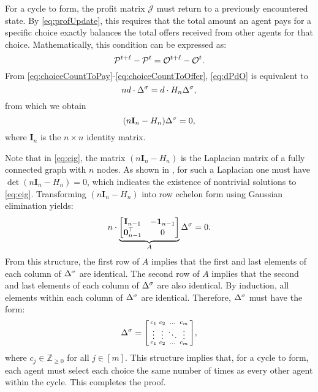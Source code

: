 \begin{customproof}
For a cycle to form, the profit matrix $\mathcal{J}$ must return to a previously encountered state. By \eqref{eq:profUpdate}, this requires that the total amount an agent pays for a specific choice exactly balances the total offers received from other agents for that choice. Mathematically, this condition can be expressed as:
\begin{equation}\label{eq:dPdO}
\mathcal{P}^{t+\ell} - \mathcal{P}^t = \mathcal{O}^{t+\ell} - \mathcal{O}^t.
\end{equation}
From \eqref{eq:choiceCountToPay}-\eqref{eq:choiceCountToOffer}, \eqref{eq:dPdO} is equivalent to
\begin{equation}
nd \cdot \Delta^\sigma = d \cdot H_n \Delta^\sigma,
\end{equation}
from which we obtain
\begin{equation}\label{eq:eig}
(n \textbf{I}_n - H_n) \Delta^\sigma = 0,
\end{equation}
where $\textbf{I}_n$ is the $n \times n$ identity matrix.

Note that in \eqref{eq:eig}, the matrix $(n \textbf{I}_n - H_n)$ is the Laplacian matrix of a fully connected graph with $n$ nodes. As shown in \cite[p.8]{lewis2013cooperative}, for such a Laplacian one must have $\det(n \textbf{I}_n - H_n) = 0$, which indicates the existence of nontrivial solutions to \eqref{eq:eig}. Transforming $(n \textbf{I}_n - H_n)$ into row echelon form using Gaussian elimination yields:
\begin{equation}
n \cdot
\underbrace{
\begin{bmatrix}
    \textbf{I}_{n-1} & -\textbf{1}_{n-1} \\
    \textbf{0}_{n-1}^\top & 0
\end{bmatrix}}_{A} \Delta^\sigma = 0.
\end{equation}
From this structure, the first row of $A$ implies that the first and last elements of each column of $ \Delta^\sigma $ are identical. The second row of $A$ implies that the second and last elements of each column of $ \Delta^\sigma $ are also identical. By induction, all elements within each column of $ \Delta^\sigma $ are identical. Therefore,  $ \Delta^\sigma $ must have the form:
\begin{equation}
\Delta^\sigma = \begin{bsmallmatrix}
    c_1 & c_2 & \ldots & c_m \\ 
    \vdots & \vdots & \ddots & \vdots \\ 
    c_1 & c_2 & \ldots & c_m 
\end{bsmallmatrix},
\end{equation}
where $ c_j \in \mathbb{Z}_{\geq 0} $ for all $ j \in [m] $. This structure implies that, for a cycle to form, each agent must select each choice the same number of times as every other agent within the cycle. This completes the proof.
\end{customproof}

